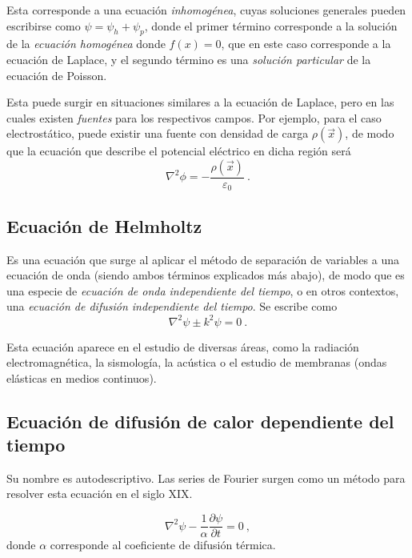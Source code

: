 Esta corresponde a una ecuación \emph{inhomogénea}, cuyas soluciones generales pueden escribirse como $\psi = \psi_h + \psi_p$, donde el primer término corresponde a la solución de la \emph{ecuación homogénea} donde $f(x) = 0$, que en este caso corresponde a la ecuación de Laplace, y el segundo término es una \emph{solución particular} de la ecuación de Poisson.

Esta puede surgir en situaciones similares a la ecuación de Laplace, pero en las cuales existen \emph{fuentes} para los respectivos campos. Por ejemplo, para el caso electrostático, puede existir una fuente con densidad de carga $\rho(\vec{x})$, de modo que la ecuación que describe el potencial eléctrico en dicha región será
\begin{equation}
    \nabla^2 \phi = - \frac{\rho(\vec{x})}{\varepsilon_0} \ .
\end{equation}

\subsection*{Ecuación de Helmholtz}

Es una ecuación que surge al aplicar el método de separación de variables a una ecuación de onda (siendo ambos términos explicados más abajo), de modo que es una especie de \emph{ecuación de onda independiente del tiempo}, o en otros contextos, una \emph{ecuación de difusión independiente del tiempo}. Se escribe como
\begin{equation}
    \nabla^2 \psi \pm k^2 \psi = 0 \ .
\end{equation}

Esta ecuación aparece en el estudio de diversas áreas, como la radiación electromagnética, la sismología, la acústica o el estudio de membranas (ondas elásticas en medios continuos).



\subsection*{Ecuación de difusión de calor dependiente del tiempo}

Su nombre es autodescriptivo. Las series de Fourier surgen como un método para resolver esta ecuación en el siglo XIX.

\begin{equation}
    \nabla^2 \psi - \frac{1}{\alpha} \frac{\partial \psi}{\partial t} = 0 \ ,
\end{equation}
donde $\alpha$ corresponde al coeficiente de difusión térmica.

